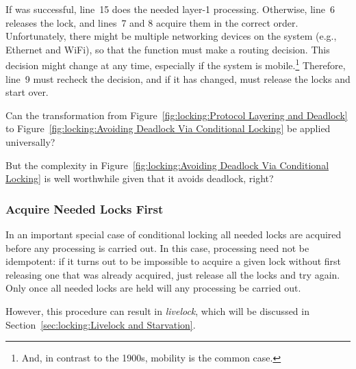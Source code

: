 If  was successful, line~15 does the needed
layer-1 processing.
Otherwise, line~6 releases the lock, and lines~7 and 8 acquire them in
the correct order.
Unfortunately, there might be multiple networking devices on
the system (e.g., Ethernet and WiFi), so that the 
function must make a routing decision.
This decision might change at any time, especially if the system
is mobile.\footnote{
	And, in contrast to the 1900s, mobility is the common case.}
Therefore, line~9 must recheck the decision, and if it has changed,
must release the locks and start over.

\QuickQuiz{}
	Can the transformation from
	Figure~\ref{fig:locking:Protocol Layering and Deadlock} to
	Figure~\ref{fig:locking:Avoiding Deadlock Via Conditional Locking}
	be applied universally?
 \QuickQuizEnd

\QuickQuiz{}
	But the complexity in
	Figure~\ref{fig:locking:Avoiding Deadlock Via Conditional Locking}
	is well worthwhile given that it avoids deadlock, right?
 \QuickQuizEnd

\subsubsection{Acquire Needed Locks First}
\label{sec:locking:Acquire Needed Locks First}

In an important special case of conditional locking all needed
locks are acquired before any processing is carried out.
In this case, processing need not be idempotent: if it turns out
to be impossible to acquire a given lock without first releasing
one that was already acquired, just release all the locks and
try again.
Only once all needed locks are held will any processing be carried out.

However, this procedure can result in \emph{livelock}, which will
be discussed in
Section~\ref{sec:locking:Livelock and Starvation}.

